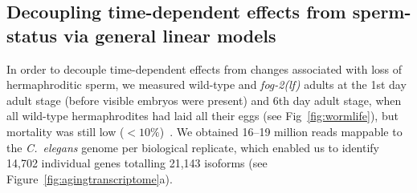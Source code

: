 \documentclass[10pt,letterpaper,twocolumn]{article}
\newcommand{\cel}{\emph{C.~elegans}}
\newcommand{\fog}{\emph{\mbox{fog-2(lf)}}}
\begin{document}
\subsection*{Decoupling time-dependent effects from sperm-status via general
linear models}
\label{sub:Transcriptomics}
In order to decouple time-dependent effects from changes associated with loss
of hermaphroditic sperm, we measured wild-type and \fog{} adults at the 1st day
adult stage (before visible embryos were present) and 6th day adult stage, when
all wild-type hermaphrodites had laid all their eggs (see
Fig~\ref{fig:wormlife}), but mortality was still low
($<10\%$)~\cite{Stroustrup2013}.  We obtained 16--19 million reads mappable to
the \cel{} genome per biological replicate, which enabled us to identify
14,702 individual genes totalling 21,143 isoforms (see
Figure~\ref{fig:agingtranscriptome}a).
\end{document}

